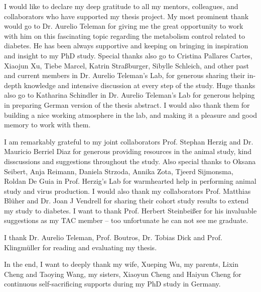 I would like to declare my deep gratitude to all my mentors, colleagues, and collaborators who have supported my thesis project. My most prominent thank would go to Dr. Aurelio Teleman for giving me the great opportunity to work with him on this fascinating topic regarding the metabolism control related to diabetes. He has been always supportive and keeping on bringing in inspiration and insight to my PhD study. Special thanks also go to Cristina Pallares Cartes, Xiaojun Xu, Tiebe Marcel, Katrin Stra{\ss}burger, Sibylle Schleich, and other past and current members in Dr. Aurelio Teleman's Lab, for generous sharing their in-depth knowledge and intensive discussion at every step of the study. Huge thanks also go to Katharina Schindler in Dr. Aurelio Teleman's Lab for generous helping in preparing German version of the thesis abstract. I would also thank them for building a nice working atmosphere in the lab, and making it a pleasure and good memory to work with them. 

I am remarkably grateful to my joint collaborators Prof. Stephan Herzig and Dr. Mauricio Berriel Diaz for generous providing resources in the animal study, kind disscussions and suggestions throughout the study. Also special thanks to Oksana Seibert, Anja Reimann, Daniela Strzoda, Annika Zota, Tjeerd Sijmonsma, Roldan De Guia in Prof. Herzig's Lab for warmhearted help in performing animal study and virus production. I would also thank my collaborators Prof. Matthias Bl\"uher and Dr. Joan J Vendrell for sharing their cohort study results to extend my study to diabetes. I want to thank Prof. Herbert Steinbei{\ss}er for his invaluable suggestions as my TAC member -- too unfortunate he can not see me graduate.

I thank Dr. Aurelio Teleman, Prof. Boutros, Dr. Tobias Dick and Prof. Klingm\"uller for reading and evaluating my thesis.

In the end, I want to deeply thank my wife, Xueping Wu, my parents, Lixin Cheng and Taoying Wang, my sisters, Xiaoyun Cheng and Haiyun Cheng for continuous self-sacrificing supports during my PhD study in Germany. 


